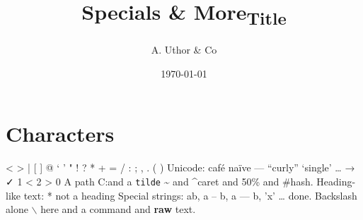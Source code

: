 \documentclass[11pt]{article}
\author{A. Uthor \& Co}
\date{\today}
\title{Specials \& More\textsubscript{Title}}
\begin{document}
\maketitle
\tableofcontents

\section{Characters}
\label{sec:org46a8b34}
< > | [ ] @ ` ' " ! ? * + = / : ; , . ( ) 
Unicode: café naïve — “curly” ‘single’ … → ✓ 1 < 2 > 0
A path C:\dir\file and a \texttt{tilde} \textasciitilde{} and \^{}caret and 50\% and \#hash.
Heading-like text: * not a heading
Special strings: a\-b, a -- b, a --- b, 'x' \ldots{} done.
Backslash alone $\backslash$ here and a \dir command and \textbf{raw} text.
\end{document}
